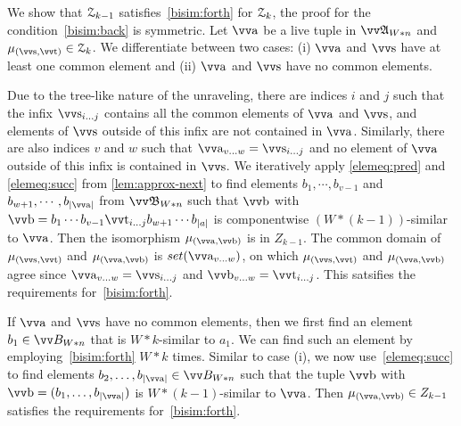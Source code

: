 \begin{proofsketch}
  We show that $\mathcal{Z}_{k-1}$ satisfies~\ref{bisim:forth} for $\mathcal{Z}_{k}$, the proof for the condition~\ref{bisim:back} is symmetric.
  Let $\elemtuptuplea$ be a live tuple in $\unravel{A}_{W * n}$ and $\mu_{(\elemtuptuples, \elemtuptuplet)} \in \bisimZ_{k}$.
  We differentiate between two cases: (i) $\elemtuptuplea$ and $\elemtuptuples$ have at least one common element and (ii) $\elemtuptuplea$ and $\elemtuptuples$ have no common elements.
  \begin{romanenumerate}
    \item
    Due to the tree-like nature of the unraveling, there are indices $i$ and $j$ such that the infix $\elemtuptuples_{i\ldots{}j}$ contains all the common elements of $\elemtuptuplea$ and $\elemtuptuples$, and elements of $\elemtuptuples$ outside of this infix are not contained in $\elemtuptuplea$.
    Similarly, there are also indices $v$ and $w$ such that $\elemtuptuplea_{v\ldots{}w} = \elemtuptuples_{i\ldots{}j}$ and no element of $\elemtuptuplea$ outside of this infix is contained in $\elemtuptuples$.
    We iteratively apply \ref{elemeq:pred} and \ref{elemeq:succ} from \cref{lem:approx-next} to find elements $b_{1}, \cdots, b_{v-1}$ and $b_{w+1}, \cdots, b_{|\elemtuptuplea|}$ from $\unravel{B}_{W * n}$ such that $\elemtuptupleb$ with $\elemtuptupleb = b_{1}\cdots{}b_{v-1}\elemtuptuplet_{i\ldots{}j}b_{w+1}\cdots{}b_{|a|}$ is componentwise $(W*(k-1))$-similar to $\elemtuptuplea$.
    Then the isomorphism $\mu_{(\elemtuptuplea,\elemtuptupleb)}$ is in $Z_{k-1}$.
    The common domain of $\mu_{(\elemtuptuples,\elemtuptuplet)}$ and $\mu_{(\elemtuptuplea,\elemtuptupleb)}$ is $\set(\elemtuptuplea_{v\ldots{}w})$, on which $\mu_{(\elemtuptuples,\elemtuptuplet)}$ and $\mu_{(\elemtuptuplea,\elemtuptupleb)}$ agree since $\elemtuptuplea_{v\ldots{}w} = \elemtuptuples_{i\ldots{}j}$ and $\elemtuptupleb_{v\ldots{}w} = \elemtuptuplet_{i\ldots{}j}$.
    This satsifies the requirements for~\ref{bisim:forth}.

    \item
    If $\elemtuptuplea$ and $\elemtuptuples$ have no common elements, then we first find an element $b_{1} \in \unraveldom{B}_{W * n}$ that is $W * k$-similar to $a_{1}$.
    We can find such an element by employing~\ref{bisim:forth} $W * k$ times.
    Similar to case (i), we now use~\ref{elemeq:succ} to find elements $b_{2}, \ldots, b_{|\elemtuptuplea|} \in \unraveldom{B}_{W * n}$ such that the tuple $\elemtuptupleb$ with $\elemtuptupleb = (b_{1}, \ldots, b_{|\elemtuptuplea|})$ is $W * (k - 1)$-similar to $\elemtuptuplea$.
    Then $\mu_{(\elemtuptuplea, \elemtuptupleb)} \in Z_{k-1}$ satisfies the requirements for~\ref{bisim:forth}.
  \end{romanenumerate}
\end{proofsketch}
